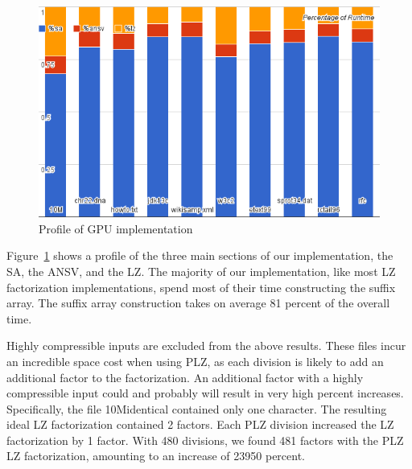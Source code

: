 \begin{figure}[ht!]
\centering
\includegraphics[width=1.0\textwidth]{images/allprof.png}
\caption{Profile of GPU implementation}
\label{fig:allprof}
\end{figure}

Figure~\ref{fig:allprof} shows a profile of the three main sections of our implementation, the SA, the ANSV, and the LZ.
The majority of our implementation, like most LZ factorization implementations, spend most of their time constructing the suffix array.
The suffix array construction takes on average 81 percent of the overall time.

Highly compressible inputs are excluded from the above results.
These files incur an incredible space cost when using PLZ, as each division is likely to add an additional factor to the factorization.
An additional factor with a highly compressible input could and probably will result in very high percent increases.
Specifically, the file 10Midentical contained only one character.
The resulting ideal LZ factorization contained 2 factors.
Each PLZ division increased the LZ factorization by 1 factor.
With 480 divisions, we found 481 factors with the PLZ LZ factorization, amounting to an increase of 23950 percent.

